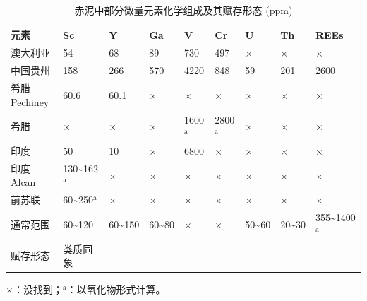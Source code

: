\begin{table}[!htbp]
	\centering
	\setlength{\belowcaptionskip}{12pt plus 0.6ex minus 0.03ex}
	\xwu
	\begin{threeparttable}
		\caption[赤泥中部分微量元素化学组成及其赋存形态]{赤泥中部分微量元素化学组成及其赋存形态 (ppm)}\label{rareelements}
		\renewcommand\arraystretch{1.2}%
		\begin{tabularx}{\linewidth}{p{1.9cm}p{1.4cm}p{1.3cm}XXXXXp{1.5cm}}%
			\toprule[1.5pt]
			元素&Sc&Y&Ga&V&Cr&U&Th&REEs\\\midrule
			澳大利亚&54&68&89&730&497&$\times$&$\times$&$\times$\\
			中国贵州&158&266&570&4220&848&59&201&2600\\
			希腊Pechiney&60.6&60.1&$\times$&$\times$&$\times$&$\times$&$\times$&$\times$\\
			希腊  &$\times$&$\times$&$\times$&1600$ \mathrm{^{a}} $ &2800$ \mathrm{^{a}} $ &$\times$&$\times$&$\times$\\
			印度&50&10&$\times$&6800&$\times$&$\times$&$\times$&$\times$\\
			印度Alcan&130\textasciitilde 162$ \mathrm{^{a}} $&$\times$&$\times$&$\times$&$\times$&$\times$&$\times$&$\times$\\
			前苏联&60\textasciitilde 250$ \mathrm{^{a}} $&$\times$&$\times$&$\times$&$\times$&$\times$&$\times$&$\times$\\
			通常范围&60\textasciitilde 120&60\textasciitilde 150&60\textasciitilde 80&$\times$&$\times$&50\textasciitilde 60&20\textasciitilde 30&355\textasciitilde 1400$ \mathrm{^{a}} $\\\midrule
			赋存形态&类质同象\\
			\bottomrule[1.5pt]
		\end{tabularx}\vspace{4pt}
		\footnotesize $ \times $：没找到；$ \mathrm{^{a}} $：以氧化物形式计算。
	\end{threeparttable}
\end{table}
